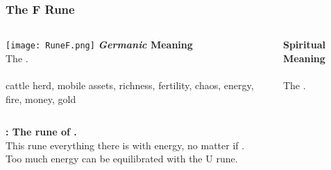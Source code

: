 \begin{frame}
\frametitle{The F Rune}
\begin{columns}[c] %

\texttt{[image: RuneF.png]}
\textbf{\textit{Germanic} Meaning}\\
The . \\
\\
cattle herd, mobile assets, richness, fertility, chaos, energy, fire, money, gold

\textbf{Spiritual Meaning}\\
\\

The .
\end{columns}

\vspace{5mm}
\textbf{: The rune of .}\\
This rune  everything there is with energy, no matter if . \\
Too much energy can be equilibrated with the U rune.
\end{frame}

